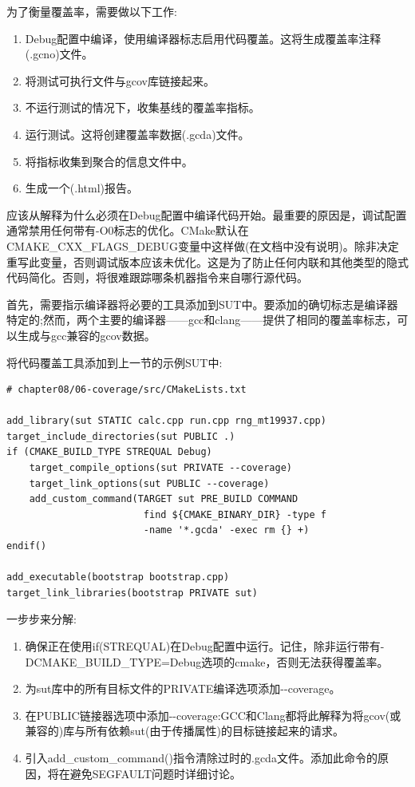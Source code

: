 为了衡量覆盖率，需要做以下工作:

\begin{enumerate}
\item 
Debug配置中编译，使用编译器标志启用代码覆盖。这将生成覆盖率注释(.gcno)文件。

\item 
将测试可执行文件与gcov库链接起来。

\item 
不运行测试的情况下，收集基线的覆盖率指标。

\item 
运行测试。这将创建覆盖率数据(.gcda)文件。

\item 
将指标收集到聚合的信息文件中。

\item 
生成一个(.html)报告。
\end{enumerate}

应该从解释为什么必须在Debug配置中编译代码开始。最重要的原因是，调试配置通常禁用任何带有-O0标志的优化。CMake默认在CMAKE\_CXX\_FLAGS\_DEBUG变量中这样做(在文档中没有说明)。除非决定重写此变量，否则调试版本应该未优化。这是为了防止任何内联和其他类型的隐式代码简化。否则，将很难跟踪哪条机器指令来自哪行源代码。

首先，需要指示编译器将必要的工具添加到SUT中。要添加的确切标志是编译器特定的;然而，两个主要的编译器——gcc和clang——提供了相同的覆盖率标志，可以生成与gcc兼容的gcov数据。

将代码覆盖工具添加到上一节的示例SUT中:

\begin{lstlisting}[style=styleCMake]
# chapter08/06-coverage/src/CMakeLists.txt

add_library(sut STATIC calc.cpp run.cpp rng_mt19937.cpp)
target_include_directories(sut PUBLIC .)
if (CMAKE_BUILD_TYPE STREQUAL Debug)
	target_compile_options(sut PRIVATE --coverage)
	target_link_options(sut PUBLIC --coverage)
	add_custom_command(TARGET sut PRE_BUILD COMMAND
						find ${CMAKE_BINARY_DIR} -type f
						-name '*.gcda' -exec rm {} +)
endif()

add_executable(bootstrap bootstrap.cpp)
target_link_libraries(bootstrap PRIVATE sut)
\end{lstlisting}

一步步来分解:

\begin{enumerate}
\item 
确保正在使用if(STREQUAL)在Debug配置中运行。记住，除非运行带有-DCMAKE\_BUILD\_TYPE=Debug选项的cmake，否则无法获得覆盖率。

\item 
为sut库中的所有目标文件的PRIVATE编译选项添加-{}-coverage。

\item 
在PUBLIC链接器选项中添加-{}-coverage:GCC和Clang都将此解释为将gcov(或兼容的)库与所有依赖sut(由于传播属性)的目标链接起来的请求。

\item 
引入add\_custom\_command()指令清除过时的.gcda文件。添加此命令的原因，将在避免SEGFAULT问题时详细讨论。
\end{enumerate}

